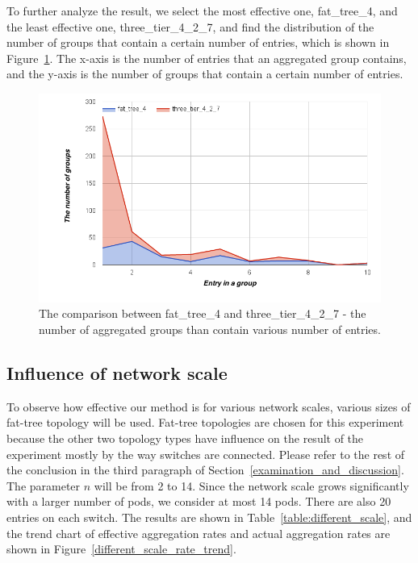 To further analyze the result, we select the most effective one, fat\_tree\_4, and the least effective one, three\_tier\_4\_2\_7, and find the distribution of the number of groups that contain a certain number of entries, which is shown in Figure~\ref{different_topo_distribute}. The x-axis is the number of entries that an aggregated group contains, and the y-axis is the number of groups that contain a certain number of entries.

\begin{figure}[H]
\begin{center} 
\includegraphics[width=1.1\linewidth]{figures/exp_topotype_distribute.png}
\end{center}
\caption{The comparison between fat\_tree\_4 and three\_tier\_4\_2\_7 - the number of aggregated groups than contain various number of entries. \sout{}}
\label{different_topo_distribute}
\end{figure}

\subsection{Influence of network scale}
To observe how effective our method is for various network scales, various sizes of fat-tree topology will be used. Fat-tree topologies are chosen for this experiment because the other two topology types have influence on the result of the experiment mostly by the way switches are connected. Please refer to the rest of the conclusion in the third paragraph of Section~\ref{examination_and_discussion}. The parameter $n$ will be from 2 to 14. Since the network scale grows significantly with a larger number of pods, we consider at most 14 pods. There are also 20 entries on each switch. The results are shown in Table~\ref{table:different_scale}, and the trend chart of effective aggregation rates and actual aggregation rates are shown in Figure~\ref{different_scale_rate_trend}.

